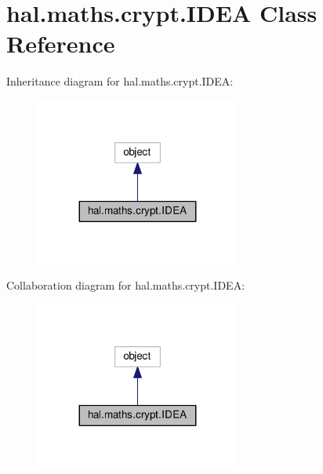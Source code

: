 \hypertarget{classhal_1_1maths_1_1crypt_1_1_i_d_e_a}{}\section{hal.\+maths.\+crypt.\+I\+D\+EA Class Reference}
\label{classhal_1_1maths_1_1crypt_1_1_i_d_e_a}


Inheritance diagram for hal.\+maths.\+crypt.\+I\+D\+EA\+:\nopagebreak
\begin{figure}[H]
\begin{center}
\leavevmode
\includegraphics[width=191pt]{classhal_1_1maths_1_1crypt_1_1_i_d_e_a__inherit__graph}
\end{center}
\end{figure}


Collaboration diagram for hal.\+maths.\+crypt.\+I\+D\+EA\+:\nopagebreak
\begin{figure}[H]
\begin{center}
\leavevmode
\includegraphics[width=191pt]{classhal_1_1maths_1_1crypt_1_1_i_d_e_a__coll__graph}
\end{center}
\end{figure}

